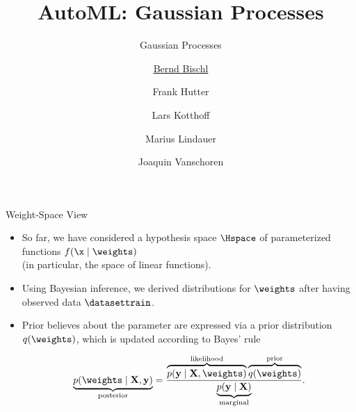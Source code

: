 


\newcommand{\lz}{\vspace{0.5cm}}
\newcommand{\thetab}{\bm{\weights}}
\newcommand{\zero}{\mathbf{0}}
\newcommand{\Xmat}{\mathbf{X}}
\newcommand{\ydat}{\mathbf{y}}
\newcommand{\id}{\boldsymbol{I}}
\newcommand{\Amat}{\mathbf{A}}
\newcommand{\Xspace}{\mathcal{X}}                                           
\newcommand{\Yspace}{\mathcal{Y}}
\newcommand{\ls}{\ell}
\newcommand{\natnum}{\mathbb{N}}
\newcommand{\intnum}{\mathbb{Z}}

\usepackage{fontawesome}
\usepackage{dirtytalk}
\usepackage{csquotes}


\title[AutoML: GPs]{AutoML: Gaussian Processes} %
\subtitle{Gaussian Processes} %
\author[Marius Lindauer]{\underline{Bernd Bischl} \and Frank Hutter \and Lars Kotthoff\newline \and Marius Lindauer \and Joaquin Vanschoren}
\institute{}
\date{}





	
	\maketitle
	

\begin{frame}[c]{Weight-Space View}

\begin{itemize}
  \item So far, we have considered a hypothesis space $\Hspace$ of parameterized functions $f(\x\mid\thetab)$ \\(in particular, the space of linear functions). 
  \lz
  \item Using Bayesian inference, we derived distributions for $\thetab$ after having observed data $\datasettrain$.
  \lz
  \item Prior believes about the parameter are expressed via a prior distribution $q(\thetab)$, which is updated according to Bayes' rule 

$$
\underbrace{p(\thetab \mid \Xmat, \ydat)}_{\text{posterior}} = \frac{\overbrace{p(\ydat \mid \Xmat, \thetab)}^{\text{likelihood}}\overbrace{q(\thetab)}^{\text{prior}}}{\underbrace{p(\ydat\mid\Xmat)}_{\text{marginal}}}.
$$
\end{itemize}

\end{frame}



